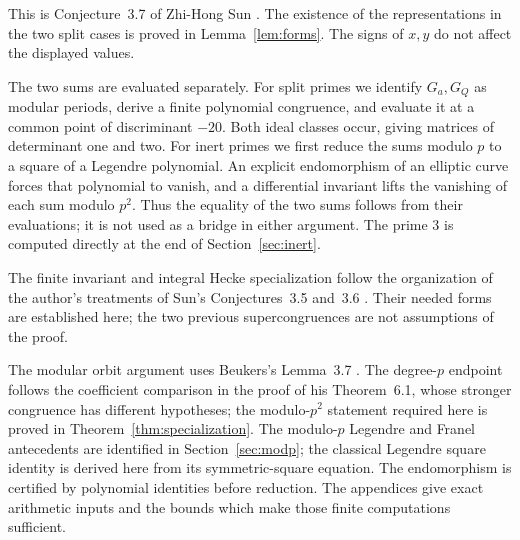 \documentclass[11pt,a4paper]{article}
\theoremstyle{remark}
\begin{document}
This is Conjecture~3.7 of Zhi-Hong Sun
\cite[p.~2742]{sun}. The existence of the representations in the two
split cases is proved in Lemma~\ref{lem:forms}. The signs of $x,y$ do
not affect the displayed values.

The two sums are evaluated separately. For split primes we identify
$G_a,G_Q$ as modular periods, derive a finite polynomial congruence,
and evaluate it at a common point of discriminant $-20$. Both ideal
classes occur, giving matrices of determinant one and two. For inert
primes we first reduce the sums modulo $p$ to a square of a Legendre
polynomial. An explicit endomorphism of an elliptic curve forces that
polynomial to vanish, and a differential invariant lifts the vanishing
of each sum modulo $p^2$. Thus the equality of the two sums follows
from their evaluations; it is not used as a bridge in either argument.
The prime $3$ is computed directly at the end of Section~\ref{sec:inert}.

The finite invariant and integral Hecke specialization follow the
organization of the author's treatments of Sun's Conjectures~3.5 and~3.6
\cite{babanskyy35,babanskyy36}. Their needed forms are established here;
the two previous supercongruences are not assumptions of the proof.

The modular orbit argument uses Beukers's Lemma~3.7
\cite{beukers}. The degree-$p$ endpoint follows the coefficient
comparison in the proof of his Theorem~6.1, whose stronger congruence
has different hypotheses; the
modulo-$p^2$ statement required here is proved in
Theorem~\ref{thm:specialization}. The modulo-$p$ Legendre and Franel
antecedents are identified in Section~\ref{sec:modp}; the classical
Legendre square identity is derived here from its symmetric-square
equation. The endomorphism is certified by polynomial identities before
reduction. The appendices give exact arithmetic inputs and the bounds
which make those finite computations sufficient.
\end{document}
